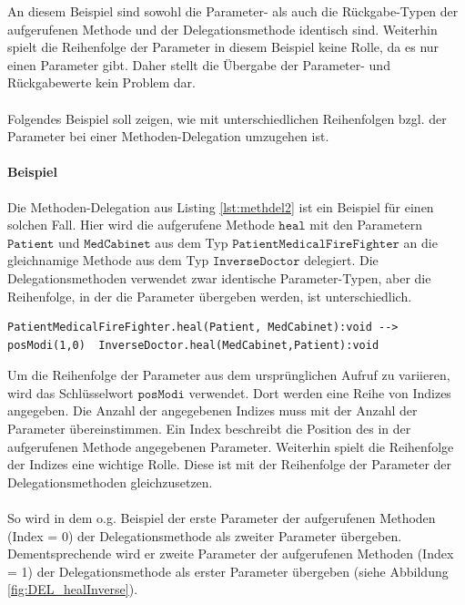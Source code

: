 \documentclass[a4paper,12pt]{article}
\begin{document}
\noindent
An diesem Beispiel sind sowohl die Parameter- als auch die Rückgabe-Typen der aufgerufenen Methode und der Delegationsmethode identisch sind. Weiterhin spielt die Reihenfolge der Parameter in diesem Beispiel keine Rolle, da es nur einen Parameter gibt. Daher stellt die Übergabe der Parameter- und Rückgabewerte kein Problem dar.\\\\
Folgendes Beispiel soll zeigen, wie mit unterschiedlichen Reihenfolgen bzgl. der Parameter bei einer Methoden-Delegation umzugehen ist.
\paragraph{Beispiel} Die Methoden-Delegation aus Listing \ref{lst:methdel2} ist ein Beispiel für einen solchen Fall. Hier wird die aufgerufene Methode $\texttt{heal}$ mit den Parametern $\texttt{Patient}$ und $\texttt{MedCabinet}$ aus dem Typ $\texttt{PatientMedicalFireFighter}$ an die gleichnamige Methode aus dem Typ $\texttt{InverseDoctor}$ delegiert. Die Delegationsmethoden verwendet zwar identische Parameter-Typen, aber die Reihenfolge, in der die Parameter übergeben werden, ist unterschiedlich.
\begin{lstlisting}[style = dsl, caption = "Methoden-Delegation mit Parametern in unterschiedlicher Reihenfolge", captionpos = b]
	PatientMedicalFireFighter.heal(Patient, MedCabinet):void --> posModi(1,0)  InverseDoctor.heal(MedCabinet,Patient):void
\end{lstlisting}\label{lst:methdel2}
\noindent
Um die Reihenfolge der Parameter aus dem ursprünglichen Aufruf zu variieren, wird das Schlüsselwort $\texttt{posModi}$ verwendet. Dort werden eine Reihe von Indizes angegeben. Die Anzahl der angegebenen Indizes muss mit der Anzahl der Parameter übereinstimmen. Ein Index beschreibt die Position des in der aufgerufenen Methode angegebenen Parameter. Weiterhin spielt die Reihenfolge der Indizes eine wichtige Rolle. Diese ist mit der Reihenfolge der Parameter der Delegationsmethoden gleichzusetzen.\\\\
So wird in dem o.g. Beispiel der erste Parameter der aufgerufenen Methoden (Index = 0) der Delegationsmethode als zweiter Parameter übergeben. Dementsprechende wird er zweite Parameter der aufgerufenen Methoden (Index = 1) der Delegationsmethode als erster Parameter übergeben (siehe Abbildung \ref{fig:DEL_healInverse}). 
\end{document}

